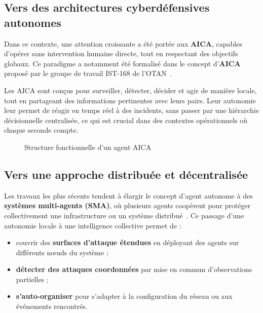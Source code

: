 \documentclass[ twoside,openright,titlepage,numbers=noenddot,headinclude,%
                footinclude=true,cleardoublepage=empty,abstractoff, %
                BCOR=5mm,paper=a4,fontsize=11pt,%
                french,american,%
                ]{scrreprt}
\begin{document}
\subsection*{Vers des architectures cyberdéfensives autonomes}

Dans ce contexte, une attention croissante a été portée aux \textbf{AICA}, capables d'opérer sans intervention humaine directe, tout en respectant des objectifs globaux. Ce paradigme a notamment été formalisé dans le concept d'\textbf{AICA} proposé par le groupe de travail IST-168 de l'OTAN~\cite{AICAGuide2022}.

Les AICA sont conçus pour surveiller, détecter, décider et agir de manière locale, tout en partageant des informations pertinentes avec leurs pairs. Leur autonomie leur permet de réagir en temps réel à des incidents, sans passer par une hiérarchie décisionnelle centralisée, ce qui est crucial dans des contextes opérationnels où chaque seconde compte.

\begin{figure}[h]
    \centering
    \caption{Structure fonctionnelle d'un agent AICA}
    \label{fig:aica_cycle}
\end{figure}

\subsection*{Vers une approche distribuée et décentralisée}

Les travaux les plus récents tendent à élargir le concept d'agent autonome à des \textbf{systèmes multi-agents (SMA)}, où plusieurs agents coopèrent pour protéger collectivement une infrastructure ou un système distribué~\cite{Brutschy2021, Wood2023}. Ce passage d'une autonomie locale à une intelligence collective permet de :

\begin{itemize}
    \item couvrir des \textbf{surfaces d'attaque étendues} en déployant des agents sur différents nœuds du système ;
    \item \textbf{détecter des attaques coordonnées} par mise en commun d'observations partielles ;
    \item \textbf{s'auto-organiser} pour s'adapter à la configuration du réseau ou aux événements rencontrés.
\end{itemize}
\end{document}
